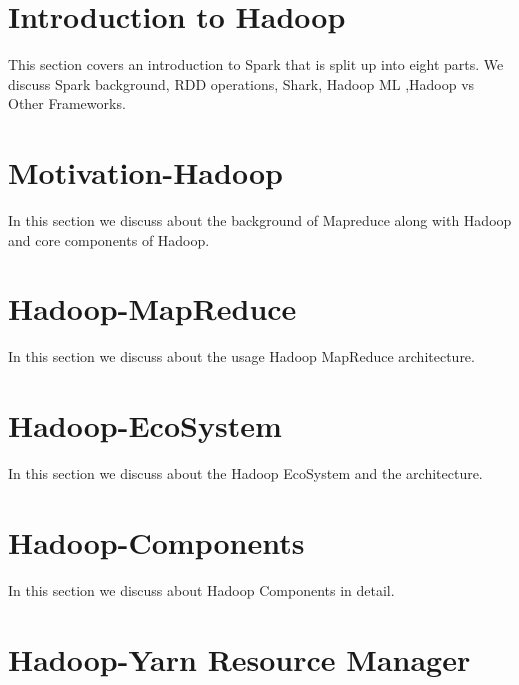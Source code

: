 \section{Introduction to Hadoop}
\label{c:spark}

This section covers an introduction to Spark that is split up
into eight parts. We discuss Spark background, RDD operations,
Shark, Hadoop ML ,Hadoop vs Other Frameworks.

\section{Motivation-Hadoop}
\label{s:motivation-spark}

In this section we discuss about the background of Mapreduce along with Hadoop and
core components of Hadoop.


\section{Hadoop-MapReduce}

In this section we discuss about the usage Hadoop MapReduce architecture.


\section{Hadoop-EcoSystem}

In this section we discuss about the Hadoop EcoSystem and the architecture. 


\section{Hadoop-Components}

In this section we discuss about Hadoop Components in detail.



\section{Hadoop-Yarn Resource Manager}

